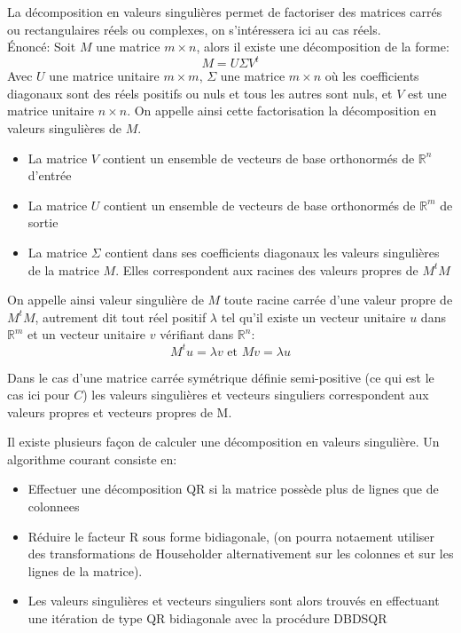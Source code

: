 \documentclass[12pt,french]{article}
\theoremstyle{plain}
\theoremstyle{definition}
\begin{document}
La décomposition en valeurs singulières permet de factoriser des matrices carrés ou rectangulaires réels ou complexes, on s'intéressera ici au cas réels. \\
Énoncé: Soit $M$ une matrice $m \times n$, alors il existe une décomposition de la forme: \\
$$M=U\Sigma V^t$$
Avec $U$ une matrice unitaire $m \times m$, $\Sigma$ une matrice $m\times n$ où les coefficients diagonaux sont des réels positifs ou nuls et tous les autres sont nuls, et $V$ est une matrice unitaire $n \times n$. On appelle ainsi cette factorisation la décomposition en valeurs singulières de $M$.
\begin{itemize}
  \item La matrice $V$ contient un ensemble de vecteurs de base orthonormés de $\mathbb{R}^n$ d'entrée
  \item La matrice $U$ contient un ensemble de vecteurs de base orthonormés de $\mathbb{R}^m$ de sortie
  \item La matrice $\Sigma$ contient dans ses coefficients diagonaux les valeurs singulières de la matrice $M$. Elles correspondent aux racines des valeurs propres de $M^t M$
\end{itemize}

On appelle ainsi valeur singulière de $M$ toute racine carrée d'une valeur propre de $M^t M$, autrement dit tout réel positif $\lambda$ tel qu'il existe un vecteur unitaire $u$ dans $\mathbb{R}^m$ et un vecteur unitaire $v$ vérifiant dans $\mathbb{R}^n$:
$$ M^t u = \lambda v \text{ et } Mv = \lambda u$$

Dans le cas d'une matrice carrée symétrique définie semi-positive (ce qui est le cas ici pour $C$) les valeurs singulières et vecteurs singuliers correspondent aux valeurs propres et vecteurs propres de M.


Il existe plusieurs façon de calculer une décomposition en valeurs singulière. Un algorithme courant consiste en:
\begin{itemize}
  \item Effectuer une décomposition QR si la matrice possède plus de lignes que de colonnees
  \item Réduire le facteur R sous forme bidiagonale, (on pourra notaement utiliser des transformations de Householder alternativement sur les colonnes et sur les lignes de la matrice).
  \item Les valeurs singulières et vecteurs singuliers sont alors trouvés en effectuant une itération de type QR bidiagonale avec la procédure DBDSQR
\end{itemize}
\end{document}
